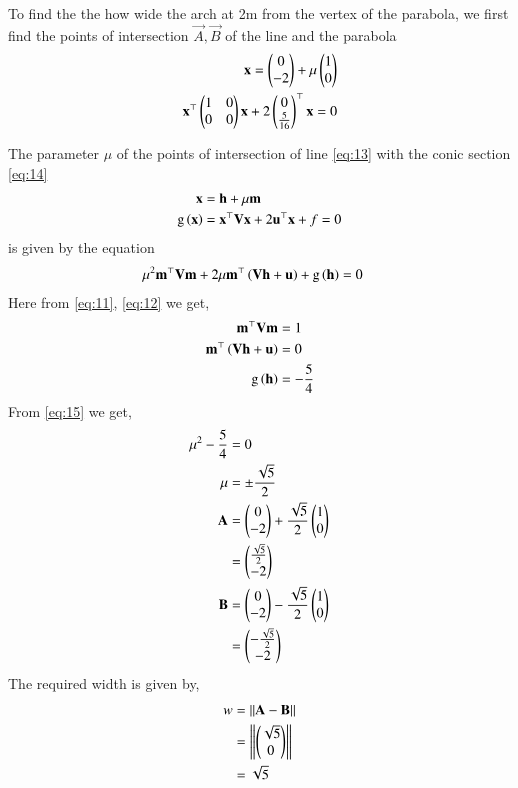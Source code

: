 \documentclass[journal,12pt,twocolumn]{IEEEtran}
\begin{document}
\begin{enumerate}
To find the the how wide the arch at 2m from the vertex of the parabola, we first find the points of intersection $\vec{A}, \vec{B}$ of the line and the parabola 
\begin{align}
\mathbf{x} = \begin{pmatrix}0\\-2\end{pmatrix} + \mu \begin{pmatrix}1\\0\end{pmatrix} \label{eq:11}\\
\mathbf{x}^\top \begin{pmatrix}1&0\\0&0\end{pmatrix}\mathbf{x} + 2\begin{pmatrix}0\\\frac{5}{16}\end{pmatrix}^\top \mathbf{x}= 0\label{eq:12}
\end{align}

The parameter $\mu$ of the points of intersection of line \eqref{eq:13} with the conic section \eqref{eq:14}
\begin{align}
\mathbf{x} &= \mathbf{h} + \mu \mathbf{m}
\label{eq:13}\\
\text{g}\left(\mathbf{x}\right) &= \mathbf{x}^{\top}\mathbf{V}\mathbf{x}+2\mathbf{u}^{\top}\mathbf{x}+f=0
\label{eq:14}
\end{align}
is given by the equation 
\begin{align}
\mu^2\mathbf{m}^{\top}\mathbf{V}\mathbf{m} + 2 \mu\mathbf{m}^{\top}\left(\mathbf{V}\mathbf{h}+\mathbf{u}\right) 
	+ \text{g}\left(\mathbf{h}\right) &=0
\label{eq:15}
\end{align}
Here from \eqref{eq:11}, \eqref{eq:12} we get,
\begin{align}
\mathbf{m}^{\top}\mathbf{V}\mathbf{m} & = 1\\
\mathbf{m}^{\top}\left(\mathbf{V}\mathbf{h}+\mathbf{u}\right) &= 0 \\
\text{g}\left(\mathbf{h}\right) &= -\frac{5}{4}
\end{align}
From \eqref{eq:15} we get,
\begin{align}
\mu^2 - \frac{5}{4} &=0\\
\mu &= \pm \frac{\sqrt5}{2}\\
\mathbf{A} &= \begin{pmatrix}0\\-2\end{pmatrix} + \frac{\sqrt5}{2} \begin{pmatrix}1\\0\end{pmatrix}\\
&= \begin{pmatrix}\frac{\sqrt5}{2} \\ -2\end{pmatrix}\\
\mathbf{B} &= \begin{pmatrix}0\\-2\end{pmatrix} - \frac{\sqrt5}{2} \begin{pmatrix}1\\0\end{pmatrix}\\
&= \begin{pmatrix}-\frac{\sqrt5}{2} \\ -2\end{pmatrix}
\end{align}
The required width is given by,
\begin{align}
w &= \left\lVert\mathbf{A} - \mathbf{B}\right\rVert\\
&= \left\lVert\begin{pmatrix}\sqrt{5}\\0\end{pmatrix}\right\rVert\\
&= \sqrt{5}
\end{align}

\begin{table}[h]
\centering

\caption{}
\label{tab:1}
\end{table}

\end{enumerate}
\end{document}

